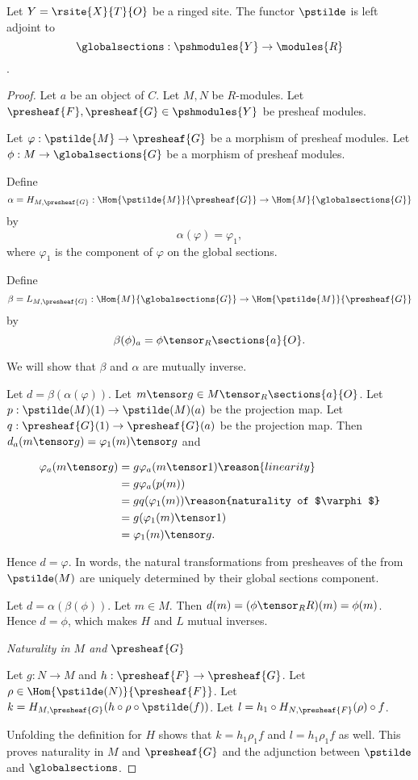 \begin{lemma}
Let $Y = \rsite{X}{T}{O}$ be a ringed site.
The functor $\pstilde$ is left adjoint to 
\[\globalsections:\pshmodules{Y} \rightarrow \modules{R}\].
\end{lemma}

\begin{proof}
Let $a$ be an object of $C$.
Let $M,N$ be $R$-modules. 
Let $\presheaf{F},\presheaf{G} \in \pshmodules{Y}$ be presheaf modules.

Let $\varphi:\pstilde{M} \rightarrow \presheaf{G}$ be a morphism of presheaf modules.
Let $\phi: M \rightarrow \globalsections{G}$ be a morphism of presheaf modules.

Define 
\[\alpha = H_{M,\presheaf{G}}: 
	\Hom{\pstilde{M}}{\presheaf{G}} \rightarrow \Hom{M}{\globalsections{G}}
\]
by
\[ \alpha(\varphi) = \varphi_1,\]
where $\varphi_1$ is the component of $\varphi$ on the global sections.

Define 
\[\beta = L_{M,\presheaf{G}}: 
	\Hom{M}{\globalsections{G}} \rightarrow \Hom{\pstilde{M}}{\presheaf{G}}
\] 
by
\[ \beta(\phi)_a = \phi \tensor_R \sections{a}{O}.\]

We will show that $\beta$ and $\alpha$ are mutually inverse. 

Let $d = \beta(\alpha(\varphi))$. 
Let $m \tensor g \in M \tensor_R \sections{a}{O}$.
Let $p: \pstilde(M)(1)\rightarrow \pstilde(M)(a)$ be the projection map.
Let $q: \presheaf{G}(1)\rightarrow \presheaf{G}(a)$ be the projection map.
Then $d_a(m \tensor g) = \varphi_1(m) \tensor g$
and

\begin{align*}
	\varphi_a(m \tensor g) &=  g \varphi_a(m \tensor 1) \reason{linearity}\\
		&= g \varphi_a(p(m)) \\
		&= g q(\varphi_1(m)) \reason{naturality of $\varphi$}\\
		&= g (\varphi_1(m) \tensor 1) \\
		&= \varphi_1(m) \tensor g.
\end{align*}

Hence $d = \varphi$. 
In words, the natural transformations from presheaves of the from $\pstilde(M)$ 
are uniquely determined by their global sections component.

Let $d = \alpha(\beta(\phi))$. 
Let $m \in M$.
Then $d(m) = (\phi \tensor_R R)(m) = \phi(m)$.
Hence $d = \phi$, which makes $H$ and $L$ mutual inverses.

\textit{Naturality in $M$ and $\presheaf{G}$}

Let $g:N\rightarrow M$ and $h:\presheaf{F} \rightarrow \presheaf{G}$.
Let $\rho \in \Hom{\pstilde(N)}{\presheaf{F}}$.
Let $k = H_{M,\presheaf{G}} (h \circ \rho \circ \pstilde(f))$.
Let $l = h_1 \circ H_{N,\presheaf{F}}(\rho) \circ f$.

Unfolding the definition for $H$ shows that $k = h_1\rho_1 f$
and $l = h_1\rho_1 f$ as well.
This proves naturality in $M$ and $\presheaf{G}$ 
and the adjunction between $\pstilde$ and $\globalsections$.
\end{proof}
